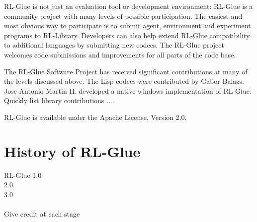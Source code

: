 \documentclass[twopage,11pt]{article}
\begin{document}
RL-Glue is not just an evaluation tool or development environment: RL-Glue is a community project with many levels of possible participation. The easiest and most obvious way to participate is to submit agent, environment and experiment programs to RL-Library. Developers can also help extend RL-Glue compatibility to additional languages by submitting new codecs. The RL-Glue project welcomes code submissions and improvements for all parts of the code base.   	

The RL-Glue Software Project has received significant contributions at many of the levels discussed above. The Lisp codecs were contributed by Gabor Balazs. Jose Antonio Martin H. developed a native windows implementation of RL-Glue. Quickly list library contributions ....

RL-Glue is available under the Apache License, Version 2.0.
	

\section{History of RL-Glue}
RL-Glue 1.0\\
2.0\\
3.0
\\\\
Give credit at each stage

%
%




\end{document}
